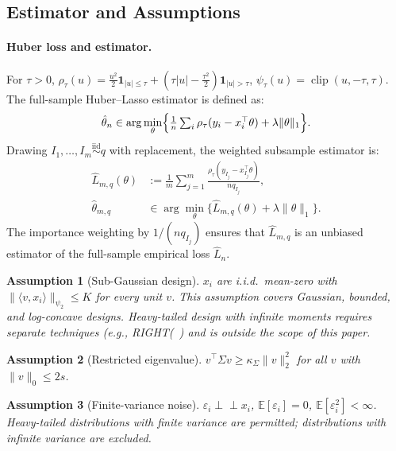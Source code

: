 \documentclass[10pt]{article}
\newtheorem{assumption}{Assumption}
\newcommand{\E}{\mathbb{E}}
\newcommand{\hL}{\hat{L}}
\newcommand{\hth}{\hat{\theta}}
\begin{document}
\subsection{Estimator and Assumptions}

\paragraph{Huber loss and estimator.}
For $\tau>0$, $\rho_\tau(u)=\frac{u^2}{2}\mathbf{1}_{|u|\le\tau}
+(\tau|u|-\frac{\tau^2}{2})\mathbf{1}_{|u|>\tau}$,
$\psi_\tau(u)=\operatorname{clip}(u,-\tau,\tau)$.
The full-sample Huber--Lasso estimator is defined as:
\begin{equation}\label{eq:full}
  \hth_n\in\arg\min_\theta\Bigl\{
  \tfrac{1}{n}\textstyle\sum_i\rho_\tau(y_i-x_i^\top\theta)
  +\lambda\|\theta\|_1\Bigr\}.
\end{equation}
Drawing $I_1,\ldots,I_m\overset{\mathrm{iid}}{\sim}q$ with replacement,
the weighted subsample estimator is:
\begin{align}
  \hL_{m,q}(\theta) &:=
    \frac{1}{m}\sum_{j=1}^m\frac{\rho_\tau(y_{I_j}-x_{I_j}^\top\theta)}{nq_{I_j}},
    \label{eq:sub_loss}\\
  \hth_{m,q} &\in\arg\min_\theta\{\hL_{m,q}(\theta)+\lambda\|\theta\|_1\}.
    \label{eq:sub_est}
\end{align}
The importance weighting by $1/(nq_{I_j})$ ensures that $\hL_{m,q}$ is an
unbiased estimator of the full-sample empirical loss $\hL_n$.

\begin{assumption}[Sub-Gaussian design]\label{assump:subgaussian}
$x_i$ are i.i.d.\ mean-zero with
$\|\langle v,x_i\rangle\|_{\psi_2}\le K$ for every unit $v$.
This assumption covers Gaussian, bounded, and log-concave designs.
Heavy-tailed design with infinite moments requires separate techniques
(e.g., RIGHT(~\cite{fan2024right}) and is outside the scope of this paper.
\end{assumption}

\begin{assumption}[Restricted eigenvalue]\label{assump:re}
$v^\top\Sigma v\ge\kappa_\Sigma\|v\|_2^2$
for all $v$ with $\|v\|_0\le 2s$.
\end{assumption}

\begin{assumption}[Finite-variance noise]\label{assump:noise}
$\varepsilon_i\perp\!\!\!\perp x_i$, $\E[\varepsilon_i]=0$,
$\E[\varepsilon_i^2]<\infty$.
Heavy-tailed distributions with finite variance are permitted;
distributions with infinite variance are excluded.
\end{assumption}
\end{document}
